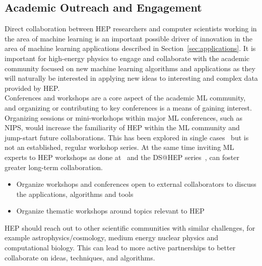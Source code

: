 \subsection{Academic Outreach and Engagement}

Direct collaboration between HEP researchers and computer scientists working in the area of machine learning is an important possible driver of innovation in the area of machine learning applications described in Section~\ref{sec:applications}.
It is important for high-energy physics to engage and collaborate with the academic community focused on new machine learning algorithms and applications as they will naturally be interested in applying new ideas to interesting and complex data provided by HEP.\\

Conferences and workshops are a core aspect of the academic ML community, and organizing or contributing to key conferences is a means of gaining interest. Organizing sessions or mini-workshops within major ML conferences, such as NIPS, would increase the familiarity of HEP within the ML community and jump-start future collaborations. This has been explored in single cases~\cite{NIPS:2015:ALEPH} but is not an established, regular workshop series. At the same time inviting ML experts to HEP workshops as done at~\cite{FlavourDataMining} and the DS@HEP series~\cite{DSatHEP2015, DSatHEP2016, DSatHEP2017}, can foster greater long-term collaboration.

\begin{itemize}
 \item Organize workshops and conferences open to external collaborators to discuss the applications, algorithms and tools
 \item Organize thematic workshops around topics relevant to HEP
\end{itemize}

HEP should reach out to other scientific communities with similar challenges, for example astrophysics/cosmology, medium energy nuclear physics and computational biology. This can lead to more active partnerships to better collaborate on ideas, techniques, and algorithms.

